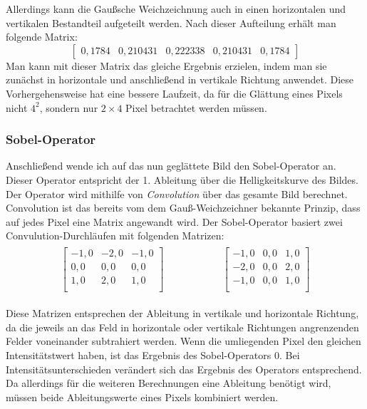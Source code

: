 Allerdings kann die Gaußsche Weichzeichnung auch in einen horizontalen und vertikalen Bestandteil aufgeteilt werden. Nach dieser Aufteilung erhält man folgende Matrix:
\begin{equation}
	\begin{bmatrix}
	0,1784&0,210431&0,222338&0,210431&0,1784
	\end{bmatrix}
\end{equation}
Man kann mit dieser Matrix das gleiche Ergebnis erzielen, indem man sie zunächst in horizontale und anschließend in vertikale Richtung anwendet. Diese Vorhergehensweise hat eine bessere Laufzeit, da für die Glättung eines Pixels nicht \(4^2\), sondern nur \(2\times 4\) Pixel betrachtet werden müssen.

\subsubsection{Sobel-Operator}
Anschließend wende ich auf das nun geglättete Bild den Sobel-Operator an. Dieser Operator entspricht der 1. Ableitung über die Helligkeitskurve des Bildes. Der Operator wird mithilfe von \textit{Convolution} über das gesamte Bild berechnet. Convolution ist das bereits vom dem Gauß-Weichzeichner bekannte Prinzip, dass auf jedes Pixel eine Matrix angewandt wird. Der Sobel-Operator basiert zwei Convulution-Durchläufen mit folgenden Matrizen:
\begin{gather}
	\begin{split}
		\begin{bmatrix}
			-1,0&-2,0&-1,0\\
			0,0&0,0&0,0\\
			1,0&2,0&1,0\\
		\end{bmatrix}
	\end{split}
	\hspace{5em}
	\begin{split}
		\begin{bmatrix}
			-1,0&0,0&1,0\\
			-2,0&0,0&2,0\\
			-1,0&0,0&1,0\\
		\end{bmatrix}
	\end{split}
\end{gather}

Diese Matrizen entsprechen der Ableitung in vertikale und horizontale Richtung, da die jeweils an das Feld in horizontale oder vertikale Richtungen angrenzenden Felder voneinander subtrahiert werden.
Wenn die umliegenden Pixel den gleichen Intensitätstwert haben, ist das Ergebnis des Sobel-Operators 0.
Bei Intensitätsunterschieden verändert sich das Ergebnis des Operators entsprechend.
Da allerdings für die weiteren Berechnungen eine Ableitung benötigt wird, müssen beide Ableitungswerte eines Pixels kombiniert werden.

